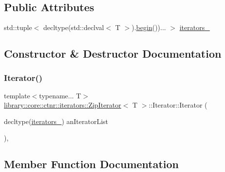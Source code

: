 \subsection*{Public Attributes}
\begin{DoxyCompactItemize}
\item 
std\+::tuple$<$ decltype(std\+::declval$<$ T $>$).\hyperlink{classlibrary_1_1core_1_1ctnr_1_1iterators_1_1_zip_iterator_a0467e25b565ac7b73b22a7002b87d189}{begin}())... $>$ \hyperlink{classlibrary_1_1core_1_1ctnr_1_1iterators_1_1_zip_iterator_1_1_iterator_a37c838a652996c4a8d140f1cc3804e4a}{iterators\+\_\+}
\end{DoxyCompactItemize}


\subsection{Constructor \& Destructor Documentation}
\mbox{\label{classlibrary_1_1core_1_1ctnr_1_1iterators_1_1_zip_iterator_1_1_iterator_ab93e780bb41bdb0fbce8e852138051a4}} 
\subsubsection{\texorpdfstring{Iterator()}{Iterator()}}
{\footnotesize\ttfamily template$<$typename... T$>$ \\
\hyperlink{classlibrary_1_1core_1_1ctnr_1_1iterators_1_1_zip_iterator}{library\+::core\+::ctnr\+::iterators\+::\+Zip\+Iterator}$<$ T $>$\+::Iterator\+::\+Iterator (\begin{DoxyParamCaption}\item[{decltype(\hyperlink{classlibrary_1_1core_1_1ctnr_1_1iterators_1_1_zip_iterator_1_1_iterator_a37c838a652996c4a8d140f1cc3804e4a}{iterators\+\_\+})}]{an\+Iterator\+List }\end{DoxyParamCaption})\hspace{0.3cm}{\ttfamily [inline]}, {\ttfamily [explicit]}}



\subsection{Member Function Documentation}
\mbox{\label{classlibrary_1_1core_1_1ctnr_1_1iterators_1_1_zip_iterator_1_1_iterator_ae3e898d5e9a5f0aa7f1f076de6af8063}} 
